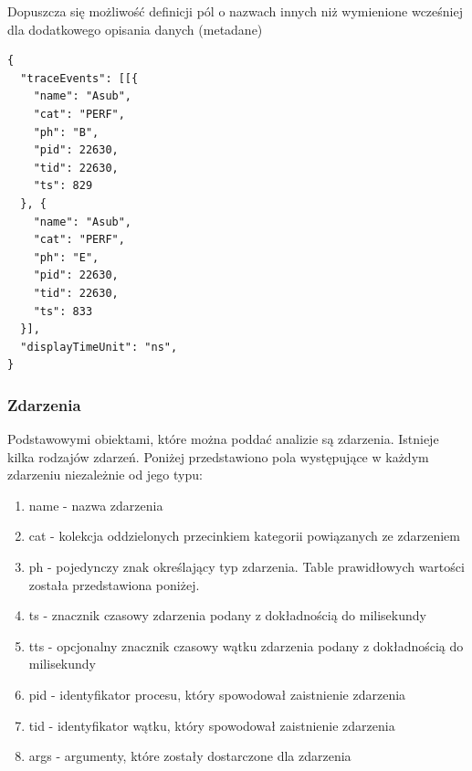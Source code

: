 \documentclass[polish, twoside, 12pt]{mwart}
\begin{document}
Dopuszcza się możliwość definicji pól o nazwach innych niż wymienione wcześniej dla dodatkowego opisania danych (metadane)

\begin{lstlisting}[caption=Przykładowy wariant obiektowy]
{
  "traceEvents": [[{
    "name": "Asub",
    "cat": "PERF",
    "ph": "B",
    "pid": 22630,
    "tid": 22630,
    "ts": 829
  }, {
    "name": "Asub",
    "cat": "PERF",
    "ph": "E",
    "pid": 22630,
    "tid": 22630,
    "ts": 833
  }],
  "displayTimeUnit": "ns",
}
\end{lstlisting}

\subsubsection{Zdarzenia}

Podstawowymi obiektami, które można poddać analizie są zdarzenia. Istnieje kilka rodzajów zdarzeń. Poniżej przedstawiono pola występujące w każdym zdarzeniu niezależnie od jego typu:

\begin{enumerate}
  \item name - nazwa zdarzenia
  \item cat - kolekcja oddzielonych przecinkiem kategorii powiązanych ze zdarzeniem
  \item ph - pojedynczy znak określający typ zdarzenia. Table prawidłowych wartości została przedstawiona poniżej.
  \item ts - znacznik czasowy zdarzenia podany z dokładnością do milisekundy
  \item tts - opcjonalny znacznik czasowy wątku zdarzenia podany z dokładnością do milisekundy
  \item pid - identyfikator procesu, który spowodował zaistnienie zdarzenia
  \item tid - identyfikator wątku, który spowodował zaistnienie zdarzenia
  \item args - argumenty, które zostały dostarczone dla zdarzenia
\end{enumerate}
\end{document}
